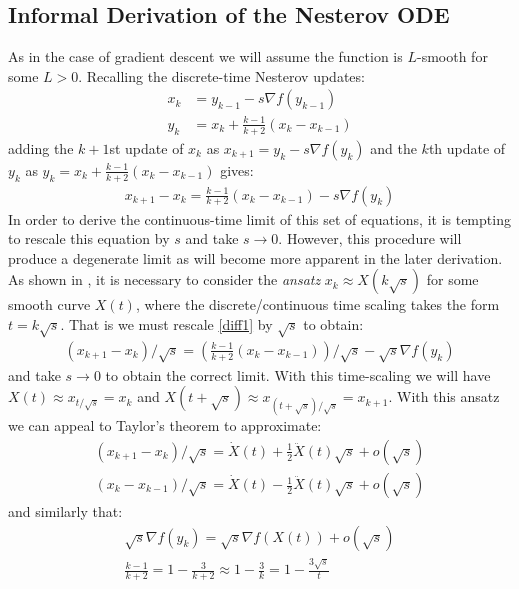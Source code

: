 \subsection{Informal Derivation of the Nesterov ODE}
As in the case of gradient descent we will assume the function is $L$-smooth for some $L > 0$. Recalling the discrete-time Nesterov updates:
\begin{align}
    x_k &= y_{k-1} - s \nabla f(y_{k-1})\\
    y_k &= x_k + \frac{k-1}{k+2} (x_k - x_{k-1}) \label{nesterov}
\end{align}
adding the $k+1$st update of $x_k$ as $x_{k+1} = y_k - s \nabla f(y_k)$ and the $k$th update of $y_k$ as $y_k = x_k + \frac{k-1}{k+2}(x_k-x_{k-1})$ gives:
\begin{align}
    x_{k+1} - x_{k} = \frac{k-1}{k+2}(x_{k}-x_{k-1}) - s \nabla f(y_k) \label{diff1}
\end{align}
In order to derive the continuous-time limit of this set of equations, it is tempting to rescale this equation by $s$ and take $s \to 0$. However, this procedure will produce a degenerate limit as will become more apparent in the later derivation. As shown in \cite{su2014differential}, it is necessary to consider the \textit{ansatz} $x_k \approx X(k \sqrt{s})$ for some smooth curve $X(t)$, where the discrete/continuous time scaling takes the form $t = k \sqrt{s}$. That is we must rescale \eqref{diff1} by $\sqrt{s}$ to obtain:
\begin{align}
    (x_{k+1} - x_{k})/\sqrt{s} = \left( \frac{k-1}{k+2}(x_{k}-x_{k-1}) \right)/\sqrt{s} - \sqrt{s} \nabla f(y_k) \label{diff2}
\end{align}
and take $s \to 0$ to obtain the correct limit. With this time-scaling we will have $X(t) \approx x_{t/\sqrt{s}} = x_k$ and $X(t+ \sqrt{s}) \approx x_{(t+\sqrt{s})/\sqrt{s}} = x_{k+1}$. With this ansatz we can appeal to Taylor's theorem to approximate:
\begin{align*}
    (x_{k+1}-x_{k})/\sqrt{s} = \dot{X}(t) + \frac{1}{2} \ddot{X}(t) \sqrt{s} + o(\sqrt{s})
    \\
    (x_k - x_{k-1})/\sqrt{s} = \dot{X}(t) - \frac{1}{2}\ddot{X}(t) \sqrt{s} + o(\sqrt{s})
\end{align*}
and similarly that:
\begin{align*}
    \sqrt{s} \nabla f(y_k) = \sqrt{s} \nabla f(X(t)) + o(\sqrt{s})
    \\
    \frac{k-1}{k+2} = 1 - \frac{3}{k+2} \approx 1 - \frac{3}{k} = 1 - \frac{3 \sqrt{s}}{t}
\end{align*}
